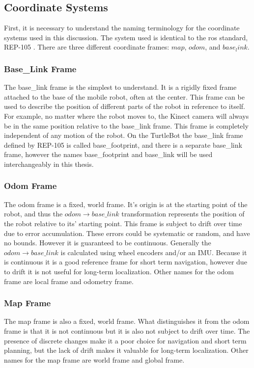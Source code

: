 \documentclass[thesis.tex]{subfile}
\begin{document}
\subsection{Coordinate Systems}
First, it is necessary to understand the naming terminology for the coordinate systems used in this discussion. The system used is identical to the \gls{ros} standard, REP-105 \cite{REP_105}. There are three different coordinate frames: $map$, $odom$, and $base_link$.

\subsubsection{Base\_Link Frame}
The base\_link frame is the simplest to understand. It is a rigidly fixed frame attached to the base of the mobile robot, often at the center. This frame can be used to describe the position of different parts of the robot in reference to itself. For example, no matter where the robot moves to, the Kinect camera will always be in the same position relative to the base\_link frame. This frame is completely independent of any motion of the robot. On the TurtleBot the base\_link frame defined by REP-105 is called base\_footprint, and there is a separate base\_link frame, however the names base\_footprint and base\_link will be used interchangeably in this thesis. 

\subsubsection{Odom Frame}
The odom frame is a fixed, world frame. It's origin is at the starting point of the robot, and thus the $odom \rightarrow base\_link$ transformation represents the position of the robot relative to its' starting point. This frame is subject to drift over time due to error accumulation. These errors could be systematic or random, and have no bounds. However it is guaranteed to be continuous. Generally the $odom \rightarrow base\_link$ is calculated using wheel encoders and/or an IMU. Because it is continuous it is a good reference frame for short term navigation, however due to drift it is not useful for long-term localization. Other names for the odom frame are local frame and odometry frame.

\subsubsection{Map Frame}
The map frame is also a fixed, world frame. What distinguishes it from the odom frame is that it is not continuous but it is also not subject to drift over time. The presence of discrete changes make it a poor choice for navigation and short term planning, but the lack of drift makes it valuable for long-term localization. Other names for the map frame are world frame and global frame.
 
\end{document}
